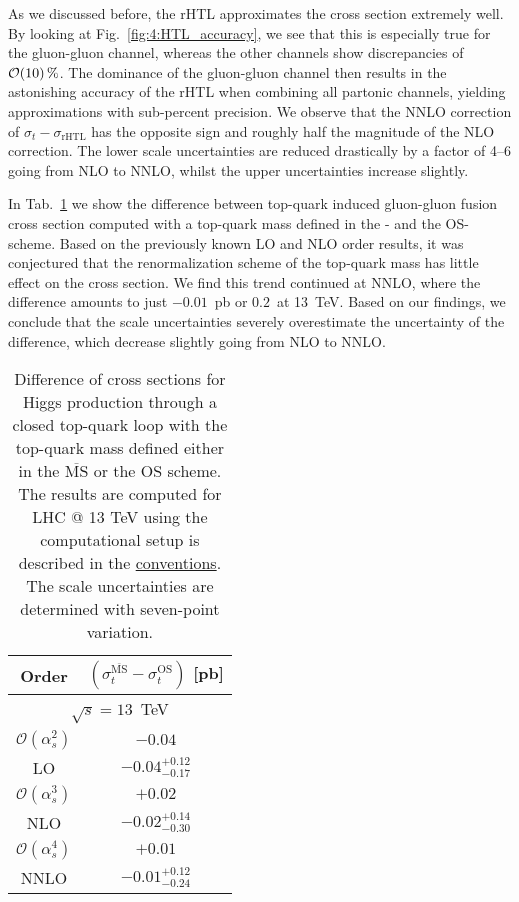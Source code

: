 As we discussed before, the \acs{rHTL} approximates the cross section extremely well. By looking at Fig.~\ref{fig:4:HTL_accuracy}, we see that this is especially true for the gluon-gluon channel, whereas the other channels show discrepancies of $\mathcal{O}\!\left(10\right)\%$. The dominance of the gluon-gluon channel then results in the astonishing accuracy of the \acs{rHTL} when combining all partonic channels, yielding approximations with sub-percent precision. We observe that the \acs{NNLO} correction of $\sigma_t - \sigma_{\text{rHTL}}$ has the opposite sign and roughly half the magnitude of the \acs{NLO} correction. The lower scale uncertainties are reduced drastically by a factor of 4--6 going from \acs{NLO} to \acs{NNLO}, whilst the upper uncertainties increase slightly.

In Tab.~\ref{tab:6:topSchemeDifference} we show the difference between top-quark induced gluon-gluon fusion cross section computed with a top-quark mass defined in the \MS- and the \acs{OS}-scheme. Based on the previously known \acs{LO} and \acs{NLO} order results, it was conjectured that the renormalization scheme of the top-quark mass has little effect on the cross section. We find this trend continued at \acs{NNLO}, where the difference amounts to just $-0.01$~pb or $0.2$\textperthousand\ at 13~TeV. Based on our findings, we conclude that the scale uncertainties severely overestimate the uncertainty of the difference, which decrease slightly going from \acs{NLO} to \acs{NNLO}.
\begin{table}[t]
  \centering
  \begin{tabular}{cc}
  \hline
      Order & $(\sigma_t^{\overline{\mathrm{MS}}} - \sigma_t^{\mathrm{OS}})$ [pb] \\
  \hline
  \hline
  \multicolumn{2}{c}{$\sqrt{s}=13$~TeV} \\
  \hline
  $\mathcal{O}(\alpha_s^2)$     & $-0.04$ \\
  LO & $-0.04^{+0.12}_{-0.17}$ \\
  \hline
  $\mathcal{O}(\alpha_s^3)$ & $+0.02$ \\
  NLO & $-0.02^{+0.14}_{-0.30}$ \\
  \hline
  $\mathcal{O}(\alpha_s^4)$ & $+0.01$ \\
  NNLO & $-0.01^{+0.12}_{-0.24}$ \\
  \hline
  \end{tabular}
  \label{tab:6:topSchemeDifference}
\caption{Difference of cross sections for Higgs production through a closed top-quark loop with the top-quark mass defined either in the $\overline{\mathrm{MS}}$ or the OS scheme. The results are computed for LHC @ 13 TeV using the computational setup is described in the \hyperref[chap:notation_and_conventions]{conventions}. The scale uncertainties are determined with seven-point variation.}
\end{table}

